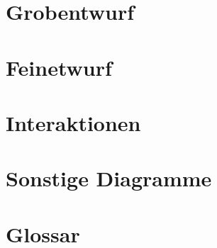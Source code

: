 

	\maketitle
	\setcounter{tocdepth}{1}
	\tableofcontents
	\chapter{Grobentwurf}
		
	\chapter{Feinetwurf}
		
	\chapter{Interaktionen}
		
	\chapter{Sonstige Diagramme}
		
	\chapter{Glossar}
		

